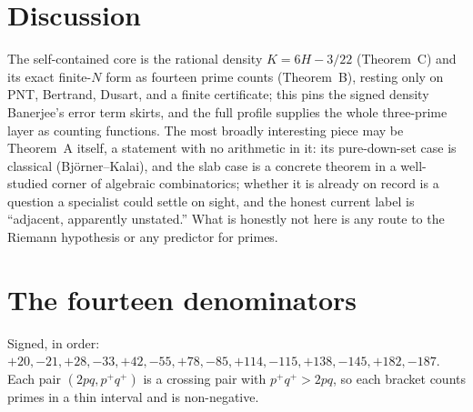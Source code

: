 \documentclass[11pt,reqno]{amsart}
\theoremstyle{plain}
\theoremstyle{definition}
\theoremstyle{plain}
\begin{document}
\section{Discussion}

The self-contained core is the rational density $K=6H-3/22$ (Theorem~C) and its exact finite-$N$
form as fourteen prime counts (Theorem~B), resting only on PNT, Bertrand, Dusart, and a finite
certificate; this pins the signed density Banerjee's error term skirts, and the full profile
supplies the whole three-prime layer as counting functions. The most broadly interesting piece
may be Theorem~A itself, a statement with no arithmetic in it: its pure-down-set case is
classical (Björner--Kalai), and the slab case is a concrete theorem in a well-studied corner of
algebraic combinatorics; whether it is already on record is a question a specialist could settle
on sight, and the honest current label is ``adjacent, apparently unstated.'' What is honestly
not here is any route to the Riemann hypothesis or any predictor for primes.

\appendix
\section{The fourteen denominators}
Signed, in order: $+20,-21,+28,-33,+42,-55,+78,-85,+114,-115,+138,-145,+182,-187$. Each pair
$(2pq,p^+q^+)$ is a crossing pair with $p^+q^+>2pq$, so each bracket counts primes in a thin
interval and is non-negative.
\end{document}
